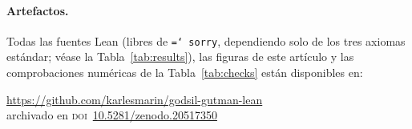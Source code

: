 \documentclass[11pt]{article}
\newcommand{\lean}[1]{\texttt{\hyphenchar\font=`\- #1}}
\begin{document}
\paragraph{Artefactos.} Todas las fuentes Lean (libres de \lean{sorry},
dependiendo solo de los tres axiomas estándar; véase la Tabla~\ref{tab:results}),
las figuras de este artículo y las comprobaciones numéricas de la
Tabla~\ref{tab:checks} están disponibles en:
\begin{center}
\url{https://github.com/karlesmarin/godsil-gutman-lean}\\[2pt]
archivado en \textsc{doi}~\href{https://doi.org/10.5281/zenodo.20517350}{10.5281/zenodo.20517350}
\end{center}



\end{document}
